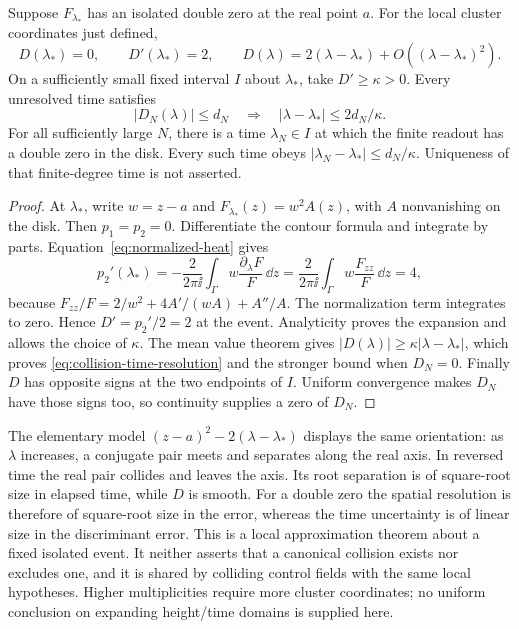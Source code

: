 \begin{proposition}
\label{prop:double-collision-resolution}
Suppose \(F_{\lambda_*}\) has an isolated double zero at the real
point \(a\). For the local cluster coordinates just defined,
\begin{equation}
 D(\lambda_*)=0,\qquad D'(\lambda_*)=2,\qquad
 D(\lambda)=2(\lambda-\lambda_*)+O((\lambda-\lambda_*)^2).
 \label{eq:double-collision-slope}
\end{equation}
On a sufficiently small fixed interval \(I\) about \(\lambda_*\),
take \(D'\ge\kappa>0\). Every unresolved time satisfies
\begin{equation}
 |D_N(\lambda)|\le d_N
 \quad\Longrightarrow\quad
 |\lambda-\lambda_*|\le2d_N/\kappa.
 \label{eq:collision-time-resolution}
\end{equation}
For all sufficiently large \(N\), there is a time \(\lambda_N\in I\)
at which the finite readout has a double zero in the disk. Every such
time obeys \(|\lambda_N-\lambda_*|\le d_N/\kappa\).
Uniqueness of that finite-degree time is not asserted.
\end{proposition}
\begin{proof}
At \(\lambda_*\), write \(w=z-a\) and
\(F_{\lambda_*}(z)=w^2A(z)\), with \(A\) nonvanishing on the disk.
Then \(p_1=p_2=0\). Differentiate the contour formula and integrate
by parts. Equation~\eqref{eq:normalized-heat} gives
\[
 p_2'(\lambda_*)=-\frac{2}{2\pi\ii}\int_\Gamma
       w\frac{\partial_\lambda F}{F}\,\dd z
 =\frac{2}{2\pi\ii}\int_\Gamma w\frac{F_{zz}}{F}\,\dd z=4,
\]
because \(F_{zz}/F=2/w^2+4A'/(wA)+A''/A\). The normalization term
integrates to zero. Hence \(D'=p_2'/2=2\) at the event.
Analyticity proves the expansion and allows the choice of \(\kappa\).
The mean value theorem gives
\(|D(\lambda)|\ge\kappa|\lambda-\lambda_*|\), which proves
\eqref{eq:collision-time-resolution} and the stronger bound when
\(D_N=0\). Finally \(D\) has opposite signs at the two endpoints
of \(I\). Uniform convergence makes \(D_N\) have those signs too,
so continuity supplies a zero of \(D_N\).
\end{proof}

The elementary model \((z-a)^2-2(\lambda-\lambda_*)\) displays the
same orientation: as \(\lambda\) increases, a conjugate pair meets
and separates along the real axis. In reversed time the real pair
collides and leaves the axis. Its root separation is of square-root
size in elapsed time, while \(D\) is smooth. For a double zero the
spatial resolution is therefore of square-root size in the error,
whereas the time uncertainty is of linear size in the discriminant
error. This is a local approximation theorem about a fixed isolated
event. It neither asserts that a canonical collision exists nor
excludes one, and it is shared by colliding control fields with the
same local hypotheses. Higher multiplicities require more cluster
coordinates; no uniform conclusion on expanding height/time domains
is supplied here.

